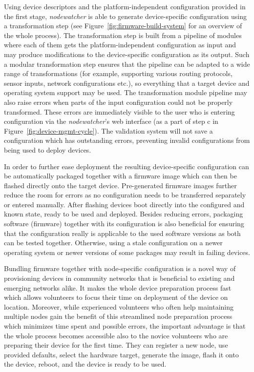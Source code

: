 \documentclass[5p,sort&compress]{elsarticle}
\newcommand{\nodewatcher}{\textit{nodewatcher}}
\begin{document}
Using device descriptors and the platform-independent configuration provided in the first stage, \nodewatcher{} is able to generate device-specific configuration using a transformation step (see Figure~\ref{fig:firmware-build-system} for an overview of the whole process).
The transformation step is built from a pipeline of modules where each of them gets the platform-independent configuration as input and may produce modifications to the device-specific configuration as its output.
Such a modular transformation step ensures that the pipeline can be adapted to a wide range of transformations (for example, supporting various routing protocols, sensor inputs, network configurations etc.), so everything that a target device and operating system support may be used.
The transformation module pipeline may also raise errors when parts of the input configuration could not be properly transformed. These errors are immediately visible to the user who is entering configuration via the \nodewatcher{}'s web interface (as a part of step c in Figure~\ref{fig:device-mgmt-cycle}).
The validation system will not save a configuration which has outstanding errors, preventing invalid configurations from being used to deploy devices.

In order to further ease deployment the resulting device-specific configuration can be automatically packaged together with a firmware image which can then be flashed directly onto the target device.
Pre-generated firmware images further reduce the room for errors as no configuration needs to be transferred separately or entered manually.
After flashing devices boot directly into the configured and known state, ready to be used and deployed.
Besides reducing errors, packaging software (firmware) together with its configuration is also beneficial for ensuring that the configuration really is applicable to the used software versions as both can be tested together.
Otherwise, using a stale configuration on a newer operating system or newer versions of some packages may result in failing devices.

Bundling firmware together with node-specific configuration is a novel way of provisioning devices in community networks that is beneficial to existing and emerging networks alike.
It makes the whole device preparation process fast which allows volunteers to focus their time on deployment of the device on location.
Moreover, while experienced volunteers who often help maintaining multiple nodes gain the benefit of this streamlined node preparation process which minimizes time spent and possible errors, the important advantage is that the whole process becomes accessible also to the novice volunteers who are preparing their device for the first time.
They can register a new node, use provided defaults, select the hardware target, generate the image, flash it onto the device, reboot, and the device is ready to be used.
\end{document}
